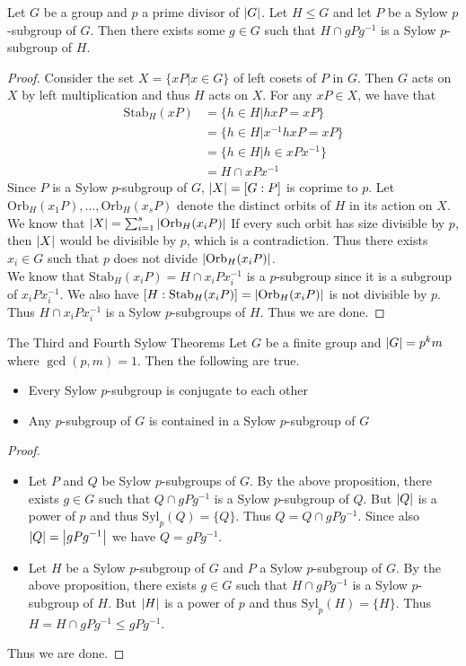 \documentclass[a4paper]{article}
\begin{document}
\begin{prp}{}{} Let $G$ be a group and $p$ a prime divisor of $\abs{G}$. Let $H\leq G$ and let $P$ be a Sylow $p$-subgroup of $G$. Then there exists some $g\in G$ such that $H\cap gPg^{-1}$ is a Sylow $p$-subgroup of $H$. 
\begin{proof}
Consider the set $X=\{xP|x\in G\}$ of left cosets of $P$ in $G$. Then $G$ acts on $X$ by left multiplication and thus $H$ acts on $X$. For any $xP\in X$, we have that 
\begin{align*}
\text{Stab}_H(xP)&=\{h\in H|hxP=xP\}\\
&=\{h\in H|x^{-1}hxP=xP\}\\
&=\{h\in H|h\in xPx^{-1}\}\\
&=H\cap xPx^{-1}
\end{align*}
Since $P$ is a Sylow $p$-subgroup of $G$, $\abs{X}=[G:P]$ is coprime to $p$. Let $\text{Orb}_H(x_1P),\dots,\text{Orb}_H(x_sP)$ denote the distinct orbits of $H$ in its action on $X$. We know that $\abs{X}=\sum_{i=1}^s\abs{\text{Orb}_H(x_iP)}$ If every such orbit has size divisible by $p$, then $\abs{X}$ would be divisible by $p$, which is a contradiction. Thus there exists $x_i\in G$ such that $p$ does not divide $\abs{\text{Orb}_H(x_iP)}$. \\
We know that $\text{Stab}_H(x_iP)=H\cap x_iPx_i^{-1}$ is a $p$-subgroup since it is a subgroup of $x_iPx_i^{-1}$. We also have $[H:\text{Stab}_H(x_iP)]=\abs{\text{Orb}_H(x_iP)}$ is not divisible by $p$. Thus $H\cap x_iPx_i^{-1}$ is a Sylow $p$-subgroups of $H$. Thus we are done. 
\end{proof}
\end{prp}

\begin{thm}{The Third and Fourth Sylow Theorems}{} Let $G$ be a finite group and $\abs{G}=p^km$ where $\gcd(p,m)=1$. Then the following are true. 
\begin{itemize}
\item Every Sylow $p$-subgroup is conjugate to each other
\item Any $p$-subgroup of $G$ is contained in a Sylow $p$-subgroup of $G$
\end{itemize} 
\begin{proof}~\\
\begin{itemize}
\item Let $P$ and $Q$ be Sylow $p$-subgroups of $G$. By the above proposition, there exists $g\in G$ such that $Q\cap gPg^{-1}$ is a Sylow $p$-subgroup of $Q$. But $\abs{Q}$ is a power of $p$ and thus $\text{Syl}_p(Q)=\{Q\}$. Thus $Q=Q\cap gPg^{-1}$. Since also $\abs{Q}=\abs{gPg^{-1}}$ we have $Q=gPg^{-1}$. 
\item Let $H$ be a Sylow $p$-subgroup of $G$ and $P$ a Sylow $p$-subgroup of $G$. By the above proposition, there exists $g\in G$ such that $H\cap gPg^{-1}$ is a Sylow $p$-subgroup of $H$. But $\abs{H}$ is a power of $p$ and thus $\text{Syl}_p(H)=\{H\}$. Thus $H=H\cap gPg^{-1}\leq gPg^{-1}$. 
\end{itemize}
Thus we are done. 
\end{proof}
\end{thm}
\end{document}
